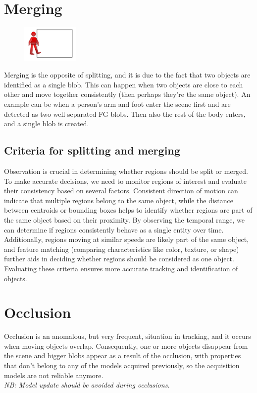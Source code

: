 \section{Merging}
\begin{figure}
    \centering
    \includegraphics[width=0.25\textwidth]{Figures/Merging.png}
\end{figure}
Merging is the opposite of splitting, and it is due to the fact that two objects are identified as a single blob. This can happen when two objects are close to each other and move together consistently (then perhaps they're the same object).
An example can be when a person’s arm and foot enter the scene first and are detected as two well-separated FG blobs. 
Then also the rest of the body enters, and a single blob is created. 

\subsection{Criteria for splitting and merging}
Observation is crucial in determining whether regions should be split or merged. 
To make accurate decisions, we need to monitor regions of interest and evaluate their consistency based on several factors. 
Consistent direction of motion can indicate that multiple regions belong to the same object, while the distance between centroids or bounding boxes helps to identify whether regions are part of the same object based on their proximity. 
By observing the temporal range, we can determine if regions consistently behave as a single entity over time. 
Additionally, regions moving at similar speeds are likely part of the same object, and feature matching (comparing characteristics like color, texture, or shape) further aids in deciding whether regions should be considered as one object. 
Evaluating these criteria ensures more accurate tracking and identification of objects.

\section{Occlusion}
Occlusion is an anomalous, but very frequent, situation in tracking, and it occurs when moving objects overlap.
Consequently, one or more objects disappear from the scene and bigger blobs appear as a result of the occlusion, with properties that don't belong to any of the models acquired previously, so the acquisition models are not reliable anymore.
\\\textit{NB: Model update should be avoided during occlusions.}

